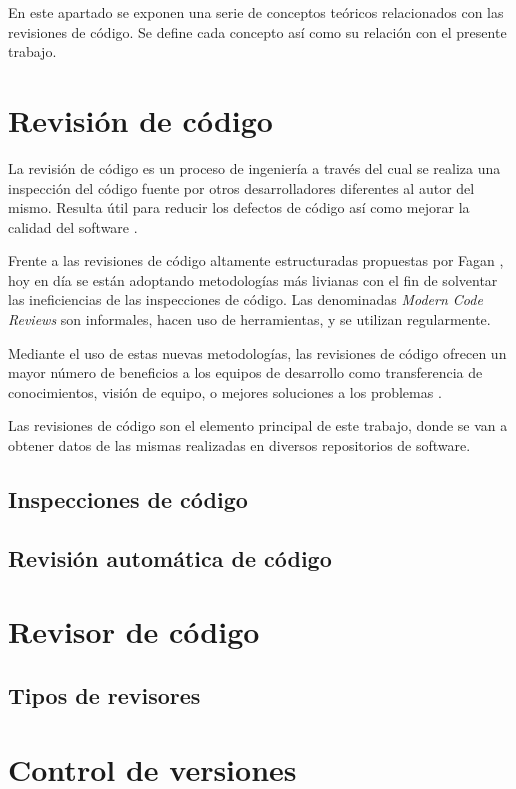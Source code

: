 
En este apartado se exponen una serie de conceptos teóricos relacionados con las revisiones de código. Se define cada concepto así como su relación con el presente trabajo.

\section{Revisión de código}
La revisión de código es un proceso de ingeniería a través del cual se realiza una inspección del código fuente por otros desarrolladores diferentes al autor del mismo. Resulta útil para reducir los defectos de código así como mejorar la calidad del software \cite{28121}.

Frente a las revisiones de código altamente estructuradas propuestas por Fagan \cite{5388086}, hoy en día se están adoptando metodologías más livianas con el fin de solventar las ineficiencias de las inspecciones de código. Las denominadas \emph{Modern Code Reviews} son informales, hacen uso de herramientas, y se utilizan regularmente.

Mediante el uso de estas nuevas metodologías, las revisiones de código ofrecen un mayor número de beneficios a los equipos de desarrollo como transferencia de conocimientos, visión de equipo, o mejores soluciones a los problemas \cite{Bacchelli:2013:EOC:2486788.2486882}.

Las revisiones de código son el elemento principal de este trabajo, donde se van a obtener datos de las mismas realizadas en diversos repositorios de software.

\subsection{Inspecciones de código}

\subsection{Revisión automática de código}
\section{Revisor de código}
\subsection{Tipos de revisores}
\section{Control de versiones}
